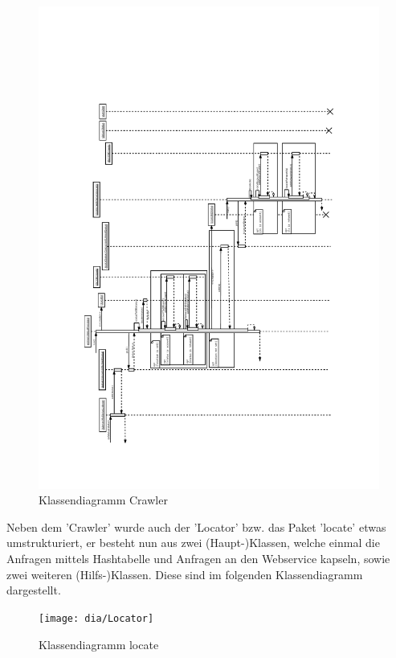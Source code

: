 \begin{figure}[h!]
	\centering
	\includegraphics[width=\textwidth,height=\textheight,keepaspectratio=true]{dia/crawler_process_sequence}
	\caption{Klassendiagramm Crawler}
	\label{fig:Crawler}
\end{figure}

Neben dem 'Crawler' wurde auch der 'Locator' bzw. das Paket 'locate' etwas umstrukturiert, er besteht nun aus zwei (Haupt-)Klassen, welche einmal die Anfragen mittels Hashtabelle und  Anfragen an den Webservice kapseln, sowie zwei weiteren (Hilfs-)Klassen. Diese sind im folgenden Klassendiagramm dargestellt.
 \begin{figure}[h!]
 	\centering
 	\texttt{[image: dia/Locator]}
 	\caption{Klassendiagramm locate}
 	\label{fig:locate}
 \end{figure}

 

